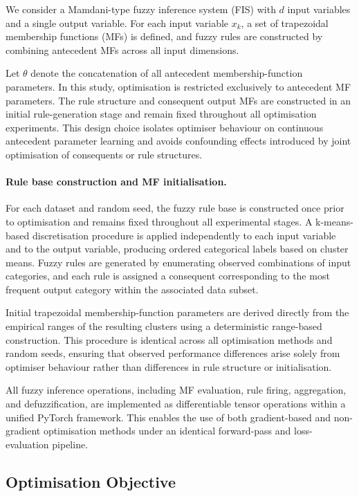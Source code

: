 \documentclass[conference]{IEEEtran}
\begin{document}
We consider a Mamdani-type fuzzy inference system (FIS) with $d$ input variables
and a single output variable.
For each input variable $x_k$, a set of trapezoidal membership functions (MFs)
is defined, and fuzzy rules are constructed by combining antecedent MFs across
all input dimensions.

Let $\theta$ denote the concatenation of all antecedent membership-function
parameters.
In this study, optimisation is restricted exclusively to antecedent MF
parameters.
The rule structure and consequent output MFs are constructed in an initial
rule-generation stage and remain fixed throughout all optimisation experiments.
This design choice isolates optimiser behaviour on continuous antecedent
parameter learning and avoids confounding effects introduced by joint
optimisation of consequents or rule structures.

\paragraph*{Rule base construction and MF initialisation.}
For each dataset and random seed, the fuzzy rule base is constructed once
prior to optimisation and remains fixed throughout all experimental stages.
A k-means-based discretisation procedure is applied independently to each
input variable and to the output variable, producing ordered categorical
labels based on cluster means.
Fuzzy rules are generated by enumerating observed combinations of input
categories, and each rule is assigned a consequent corresponding to the most
frequent output category within the associated data subset.

Initial trapezoidal membership-function parameters are derived directly from
the empirical ranges of the resulting clusters using a deterministic
range-based construction.
This procedure is identical across all optimisation methods and random seeds,
ensuring that observed performance differences arise solely from optimiser
behaviour rather than differences in rule structure or initialisation.

All fuzzy inference operations, including MF evaluation, rule firing,
aggregation, and defuzzification, are implemented as differentiable tensor
operations within a unified PyTorch framework.
This enables the use of both gradient-based and non-gradient optimisation
methods under an identical forward-pass and loss-evaluation pipeline.
\subsection{Optimisation Objective}
\end{document}
